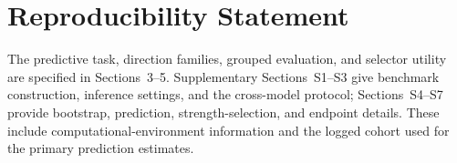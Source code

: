 \section*{Reproducibility Statement}
The predictive task, direction families, grouped evaluation, and selector
utility are specified in Sections~3--5. Supplementary Sections~S1--S3 give
benchmark construction, inference settings, and the cross-model protocol;
Sections~S4--S7 provide bootstrap, prediction, strength-selection, and endpoint
details. These include computational-environment information and the logged
cohort used for the primary prediction estimates.
